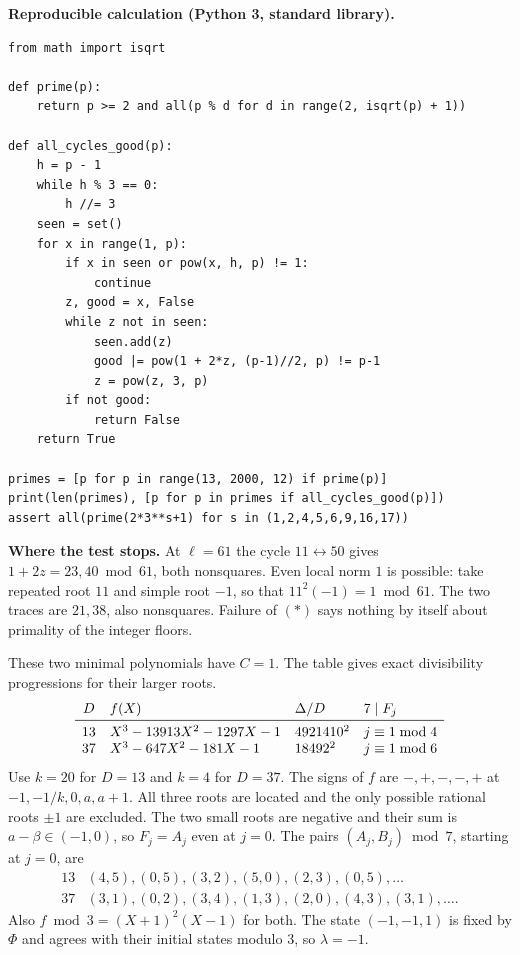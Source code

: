\documentclass[11pt,a4paper,oneside,openany]{book}
\newcommand{\lead}[1]{\textbf{#1}\enspace}\let\para\lead
\begin{document}
\lead{Reproducible calculation (Python 3, standard library).}
{\small
\begin{Verbatim}[fontsize=\footnotesize,breaklines,breakanywhere]
from math import isqrt

def prime(p):
    return p >= 2 and all(p % d for d in range(2, isqrt(p) + 1))

def all_cycles_good(p):
    h = p - 1
    while h % 3 == 0:
        h //= 3
    seen = set()
    for x in range(1, p):
        if x in seen or pow(x, h, p) != 1:
            continue
        z, good = x, False
        while z not in seen:
            seen.add(z)
            good |= pow(1 + 2*z, (p-1)//2, p) != p-1
            z = pow(z, 3, p)
        if not good:
            return False
    return True

primes = [p for p in range(13, 2000, 12) if prime(p)]
print(len(primes), [p for p in primes if all_cycles_good(p)])
assert all(prime(2*3**s+1) for s in (1,2,4,5,6,9,16,17))
\end{Verbatim}
}
\lead{Where the test stops.} At $\ell=61$ the cycle $11\leftrightarrow50$ gives $1+2z=23,40\bmod61$, both nonsquares. Even local norm $1$ is possible: take repeated root $11$ and simple root $-1$, so that $11^2(-1)=1\bmod61$. The two traces are $21,38$, also nonsquares. Failure of $(*)$ says nothing by itself about primality of the integer floors.



These two minimal polynomials have $C=1$. The table gives exact divisibility progressions for their larger roots.
\[
\begin{array}{clll}
D & f(X)& \Delta/D & 7\mid F_j\\ \midrule
13&X^3-13913X^2-1297X-1 &4921410^2&j\equiv1\bmod4\\
37&X^3-647X^2-181X-1    &18492^2 &j\equiv1\bmod6
\end{array}
\]
Use $k=20$ for $D=13$ and $k=4$ for $D=37$. The signs of $f$ are $-,+,-,-,+$ at $-1,-1/k,0,a,a+1$. All three roots are located and the only possible rational roots $\pm1$ are excluded. The two small roots are negative and their sum is $a-\beta\in(-1,0)$, so $F_j=A_j$ even at $j=0$. The pairs $(A_j,B_j)\bmod7$, starting at $j=0$, are
\[
\begin{array}{cl}
13 &(4,5),(0,5),(3,2),(5,0),(2,3),(0,5),\ldots\\
37 &(3,1),(0,2),(3,4),(1,3),(2,0),(4,3),(3,1),\ldots .
\end{array}
\]
Also $f\bmod3=(X+1)^2(X-1)$ for both. The state $(-1,-1,1)$ is fixed by $\Phi$ and agrees with their initial states modulo $3$, so $\lambda=-1$.
\end{document}
